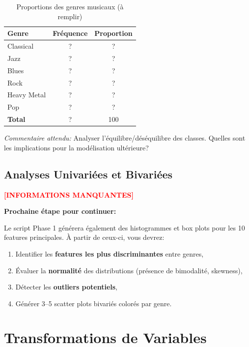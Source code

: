 \documentclass[11pt,a4paper,french]{report}
\begin{document}
\begin{table}[H]
\centering
\caption{Proportions des genres musicaux (à remplir)}
\begin{tabular}{|l|c|c|}
\hline
\textbf{Genre} & \textbf{Fréquence} & \textbf{Proportion} \\
\hline
Classical & ? & ?\\%
Jazz & ? & ?\\%
Blues & ? & ?\\%
Rock & ? & ?\\%
Heavy Metal & ? & ?\\%
Pop & ? & ?\\%
\hline
\textbf{Total} & ? & 100\\%
\hline
\end{tabular}
\label{tab:genre_dist}
\end{table}

\textit{Commentaire attendu:} Analyser l'équilibre/déséquilibre des classes. Quelles sont les implications pour la modélisation ultérieure?

\subsection{Analyses Univariées et Bivariées}

\textcolor{red}{\textbf{[INFORMATIONS MANQUANTES]}}

\textbf{Prochaine étape pour continuer:}

Le script Phase 1 générera également des histogrammes et box plots pour les 10 features principales. À partir de ceux-ci, vous devrez:

\begin{enumerate}
    \item Identifier les \textbf{features les plus discriminantes} entre genres,
    \item Évaluer la \textbf{normalité} des distributions (présence de bimodalité, skewness),
    \item Détecter les \textbf{outliers potentiels},
    \item Générer 3--5 scatter plots bivariés colorés par genre.
\end{enumerate}

\section{Transformations de Variables}
\end{document}
